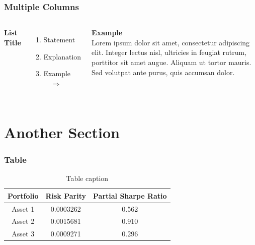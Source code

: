 \documentclass[aspectratio=169,xcolor=dvipsnames]{beamer}
\begin{document}
\begin{frame}
\frametitle{Multiple Columns}
    \begin{columns}[c] %

        \textbf{List Title}
        \begin{enumerate}
            \item Statement
            \pause
            \item Explanation
            \pause
            \item Example $\quad\Longrightarrow$
        \end{enumerate}

        \textbf{Example}\\
        Lorem ipsum dolor sit amet, consectetur adipiscing elit. Integer lectus nisl, ultricies in feugiat rutrum, porttitor sit amet augue. Aliquam ut tortor mauris. Sed volutpat ante purus, quis accumsan dolor.

    \end{columns}
\end{frame}

\section{Another Section}

\begin{frame}
\frametitle{Table}
    \begin{table}
        \begin{tabular}{c c c}
            \toprule
            \textbf{Portfolio} & \textbf{Risk Parity} & \textbf{Partial Sharpe Ratio} \\
            \midrule
            Asset 1         & 0.0003262           & 0.562               \\
            Asset 2         & 0.0015681           & 0.910               \\
            Asset 3         & 0.0009271           & 0.296               \\
            \bottomrule
        \end{tabular}
        \caption{Table caption}
    \end{table}
\end{frame}
\end{document}
